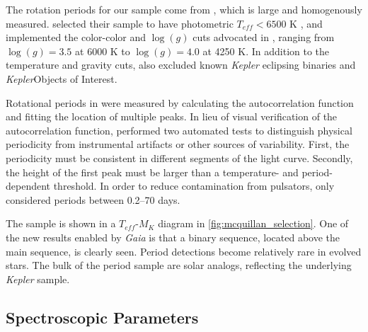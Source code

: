 \documentclass[manuscript]{aastex6}
\newcommand{\Kepler}{\mbox{\textit{Kepler}}}
\newcommand{\Gaia}{\mbox{\textit{Gaia}}}
\newcommand{\Teff}{\ensuremath{T_{eff}}}
\newcommand{\logg}{\ensuremath{\log(g)}}
\begin{document}
The rotation periods for our sample come from \citet{McQuillan14}, which
is large and homogenously measured. \citet{McQuillan14} selected their sample 
to have photometric \(\Teff < 6500\) K \citep{Brown11,Dressing13}, and 
implemented the color-color and \logg{} cuts advocated in \citet{Ciardi11}, 
ranging from \(\logg = 3.5\) at 6000 K to \(\logg = 4.0\) at 4250 K. 
In addition to the temperature and gravity cuts, \citet{McQuillan14} also 
excluded known \Kepler{} eclipsing binaries and \Kepler Objects of Interest. 

Rotational periods in \citet{McQuillan14} were measured by calculating the 
autocorrelation function and fitting the location of multiple peaks. In lieu 
of visual verification of the autocorrelation function, \citet{McQuillan14}
performed two automated tests to distinguish physical periodicity from
instrumental artifacts or other sources of variability. First, the 
periodicity must be consistent in different segments of the light curve.
Secondly, the height of the first peak must be larger than a temperature- and
period-dependent threshold. In order to reduce contamination from pulsators, 
\citet{McQuillan14} only considered periods between 0.2--70 days.

\begin{figure*}[htb]
    \centering
    \caption{\emph{Left:} \Teff-\(M_K\) density plot of the sample of
        \citet{McQuillan14} period detections. Color represents the number of
        objects in each bin. A binary sequence is clearly 
        visible above the lower main sequence. Temperatures are from
        \citet{Pinsonneault12}. The bin size is 100 K in
        temperature and 0.02 mag in K-band absolute magnitude. A 
        representative error bar is shown on the bottom right corner. 
        \emph{Right:} The variation in the \citet{McQuillan14} period 
        detection fraction across the \Teff-\(M_K\) 
    diagram.}\label{fig:mcquillan_selection}
\end{figure*}

The \citet{McQuillan14} sample is shown in a \Teff-\(M_K\)
diagram in \cref{fig:mcquillan_selection}. One of the new results enabled by 
\Gaia{} is that a binary sequence,
located above the main sequence, is clearly seen. Period detections become
relatively rare in evolved stars. The bulk of the period sample are solar
analogs, reflecting the underlying \Kepler{} sample.

\subsection{Spectroscopic Parameters}
\end{document}
